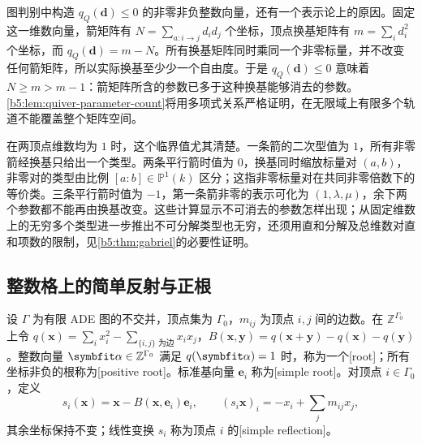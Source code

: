 图判别中构造 \(q_Q(\mathbf d)\leq0\) 的非零非负整数向量，还有一个表示论上的原因。固定这一维数向量，箭矩阵有 \(N=\sum_{a:i\to j}d_id_j\) 个坐标，顶点换基矩阵有 \(m=\sum_i d_i^2\) 个坐标，而 \(q_Q(\mathbf d)=m-N\)。所有换基矩阵同时乘同一个非零标量，并不改变任何箭矩阵，所以实际换基至少少一个自由度。于是 \(q_Q(\mathbf d)\leq0\) 意味着 \(N\geq m>m-1\)：箭矩阵所含的参数已多于这种换基能够消去的参数。\cref{b5:lem:quiver-parameter-count}将用多项式关系严格证明，在无限域上有限多个轨道不能覆盖整个矩阵空间。

\ProseParagraphBreak

在两顶点维数均为 \(1\) 时，这个临界值尤其清楚。一条箭的二次型值为 \(1\)，所有非零箭经换基只给出一个类型。两条平行箭时值为 \(0\)，换基同时缩放标量对 \((a,b)\)，非零对的类型由比例 \([a:b]\in\mathbb P^1(k)\) 区分；这指非零标量对在共同非零倍数下的等价类。三条平行箭时值为 \(-1\)，第一条箭非零的表示可化为 \((1,\lambda,\mu)\)，余下两个参数都不能再由换基改变。这些计算显示不可消去的参数怎样出现；从固定维数上的无穷多个类型进一步推出不可分解类型也无穷，还须用直和分解及总维数对直和项数的限制，见\cref{b5:thm:gabriel}的必要性证明。

\subsection{整数格上的简单反射与正根}
\label{b5:subsec:1001:05}

\begin{definition}\label{b5:def:quiver-roots-reflections}
	设 \(\Gamma\) 为有限 ADE 图的不交并，顶点集为 \(\Gamma_0\)，\(m_{ij}\) 为顶点 \(i,j\) 间的边数。在 \(\mathbb Z^{\Gamma_0}\) 上令 \(q(\mathbf x)=\sum_i x_i^2-\sum_{\{i,j\}\text{ 为边}}x_ix_j\)，\(B(\mathbf x,\mathbf y)=q(\mathbf x+\mathbf y)-q(\mathbf x)-q(\mathbf y)\)。整数向量 \(\symbfit\alpha\in\mathbb Z^{\Gamma_0}\) 满足 \(q(\symbfit\alpha)=1\) 时，称为一个[root]；所有坐标非负的根称为[positive root]。标准基向量 \(\mathbf e_i\) 称为[simple root]。对顶点 \(i\in\Gamma_0\)，定义
	\begin{equation}\label{b5:eq:quiver-simple-reflection}
		s_i(\mathbf x)=\mathbf x-B(\mathbf x,\mathbf e_i)\mathbf e_i, \qquad (s_i\mathbf x)_i=-x_i+\sum_j m_{ij}x_j,
	\end{equation}
	其余坐标保持不变；线性变换 \(s_i\) 称为顶点 \(i\) 的[simple reflection]。
\end{definition}


